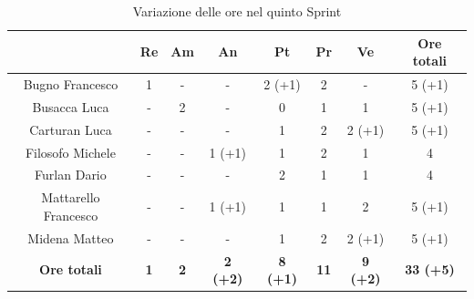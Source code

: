 \begin{table}[H]
  \centering
  \renewcommand{\arraystretch}{1.8}
  \begin{tabular}{c|c|c|c|c|c|c|c}
    \rowcolor[HTML]{125E28}
    \multicolumn{1}{c}{\color[HTML]{FFFFFF}\textbf{ Nominativo }}
                         & \multicolumn{1}{c}{\color[HTML]{FFFFFF}\textbf{ Re }}
                         & \multicolumn{1}{c}{\color[HTML]{FFFFFF}\textbf{ Am}}
                         & \multicolumn{1}{c}{\color[HTML]{FFFFFF}\textbf{ An }}
                         & \multicolumn{1}{c}{\color[HTML]{FFFFFF}\textbf{ Pt }}
                         & \multicolumn{1}{c}{\color[HTML]{FFFFFF}\textbf{ Pr }}
                         & \multicolumn{1}{c}{\color[HTML]{FFFFFF}\textbf{ Ve }}
                         & \multicolumn{1}{c}{\color[HTML]{FFFFFF}\textbf{ Ore totali }}                                                                                                     \\
    \hline
    Bugno Francesco      & 1                                                             & -          & -               & 2 (+1)          & 2           & -               & 5 (+1)           \\
    Busacca Luca         & -                                                             & 2          & -               & 0               & 1           & 1               & 5 (+1)           \\
    Carturan Luca        & -                                                             & -          & -               & 1               & 2           & 2 (+1)          & 5 (+1)           \\
    Filosofo Michele     & -                                                             & -          & 1 (+1)          & 1               & 2           & 1               & 4                \\
    Furlan Dario         & -                                                             & -          & -               & 2               & 1           & 1               & 4                \\
    Mattarello Francesco & -                                                             & -          & 1 (+1)          & 1               & 1           & 2               & 5 (+1)           \\
    Midena Matteo        & -                                                             & -          & -               & 1               & 2           & 2 (+1)          & 5 (+1)           \\
    \textbf{Ore totali}  & \textbf{1}                                                    & \textbf{2} & \textbf{2 (+2)} & \textbf{8 (+1)} & \textbf{11} & \textbf{9 (+2)} & \textbf{33 (+5)}
  \end{tabular}
  \caption{Variazione delle ore nel quinto Sprint}
\end{table}

